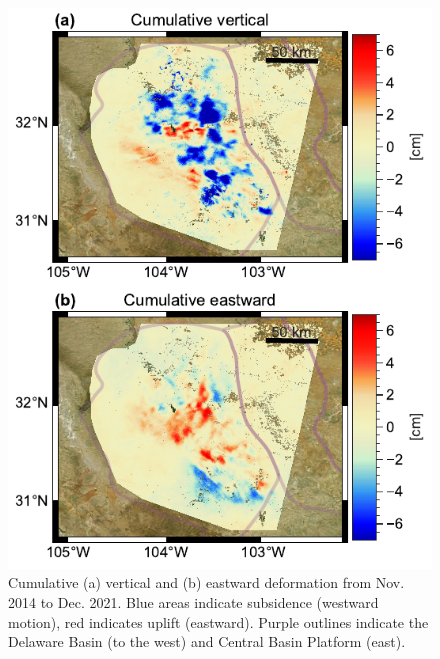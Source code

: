 \begin{figure}
	\centering
	\includegraphics[height=.9\textheight]{figures/chapter5-lowess/figure-results-east-up-clipped.pdf}
	\caption[Cumulative 7-year vertical and eastward deformation]{
		Cumulative (a) vertical and (b) eastward deformation from Nov. 2014 to Dec. 2021. Blue areas indicate subsidence (westward motion), red indicates uplift (eastward). Purple outlines indicate the Delaware Basin (to the west) and Central Basin Platform (east).
	}
	\label{fig:ch5-results-east-up}
\end{figure}








